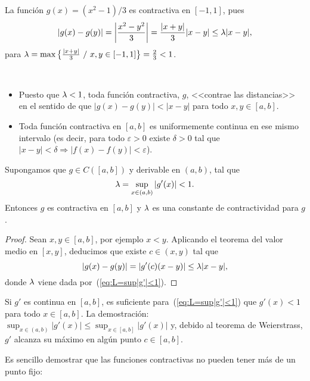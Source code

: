 \begin{example}
La función $g(x)=(x^2-1)/3$ es contractiva en $[-1,1]$, pues
$$
|g(x)-g(y)|=\left|\frac{x^2-y^2}{3}\right| = \frac{|x+y|}{3}|x-y| \le
\lambda |x-y|,
$$
para $\lambda=\max \big\{ \frac{|x+y|}{3}\ /\ x,y\in [-1,1]
\big\} =\frac23 <1$.
\end{example}

\begin{remark}~
  \begin{itemize}
  \item Puesto que $\lambda<1$, toda función contractiva, $g$, <<contrae las
    distancias>> en el sentido de que $|g(x)-g(y)|<|x-y|$ para todo
    $x,y\in [a,b]$.
  \item Toda función contractiva en $[a,b]$ es
    uniformemente continua en ese mismo intervalo (es decir, para
    todo $\varepsilon>0$ existe $\delta>0$ tal que $|x-y|<\delta
    \Rightarrow |f(x)-f(y)|<\varepsilon$).
\end{itemize}
\end{remark}

\begin{proposition}
  \label{pro:1}
  Supongamos que $g\in C([a,b])$ y derivable en $(a,b)$, tal que
  \begin{equation}
    \lambda=\sup_{x\in(a,b)} |g'(x)|<1.
    \label{eq:L=sup|g'|<1}
  \end{equation}
  Entonces $g$ es contractiva en $[a,b]$ y $\lambda$ es una
  constante de contractividad para $g$.
\end{proposition}
\begin{proof}
  Sean $x,y\in [a,b]$, por ejemplo $x<y$. Aplicando el teorema del
  valor medio en $[x,y]$, deducimos que existe $c\in (x,y)$ tal que
  \begin{equation*}
    |g(x)-g(y)|=|g'(c)(x-y)| \le \lambda |x-y|,
  \end{equation*}
  donde $\lambda$ viene dada por~(\ref{eq:L=sup|g'|<1}).
\end{proof}

\begin{remark}
  Si $g'$ es continua en $[a,b]$, es suficiente
  para~(\ref{eq:L=sup|g'|<1}) que $g'(x)<1$ para todo $x\in[a,b]$. 
  La demostración: $\sup_{x\in(a,b)}|g'(x)| \le \sup_{x\in[a,b]}
  |g'(x)|$ y, debido al teorema de Weierstrass, $g'$ alcanza su máximo
  en algún punto $c\in [a,b]$.
  \label{rk:3}
\end{remark}
Es sencillo demostrar que las funciones contractivas no pueden tener
más de un punto fijo:

